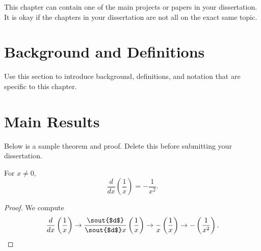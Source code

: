 This chapter can contain one of the main projects or papers in your dissertation.
It is okay if the chapters in your dissertation are not all on the exact same topic.

\section{Background and Definitions}

Use this section to introduce background, definitions, and notation that are specific to this chapter.

\section{Main Results}

Below is a sample theorem and proof. Delete this before submitting your dissertation.

\begin{theorem}
For $x \neq 0$,
\[
   \frac{d}{dx}\left(\frac{1}{x}\right)=-\frac{1}{x^2}.
\]
\end{theorem}

\begin{proof}
We compute
\[
    \frac{d}{dx}\left( \frac{1}{x}\right)
    \rightarrow 
    \frac{\text{\sout{$d$}}}{\text{\sout{$d$}}x}\left( \frac{1}{x}\right)
    \rightarrow
    \frac{ }{x}\left( \frac{1}{x}\right)
    \rightarrow
    - \left( \frac{1}{x^2}\right).
\]
\end{proof}